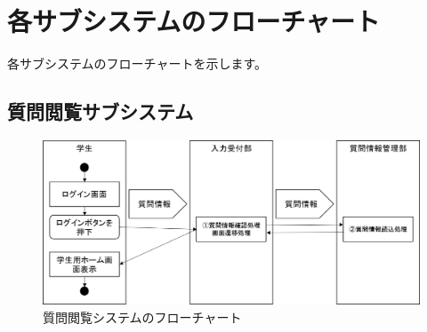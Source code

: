 \section{各サブシステムのフローチャート}
各サブシステムのフローチャートを示します。

\subsection{質問閲覧サブシステム}

\begin{figure}[htbp]
  \begin{center}
    \includegraphics[width=1\linewidth,clip]{./img/質問閲覧システム}
    \caption{質問閲覧システムのフローチャート}\label{fig:03}
  \end{center}
\end{figure}
